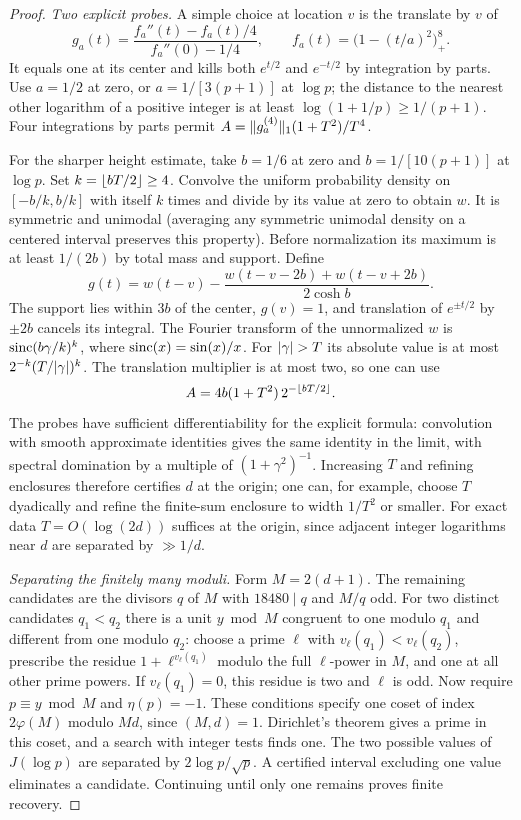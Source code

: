 \begin{proof}
\emph{Two explicit probes.} A simple choice at location $v$ is the translate by $v$ of
\[
 g_a(t)=\frac{f_a''(t)-f_a(t)/4}{f_a''(0)-1/4},\qquad f_a(t)=\bigl(1-(t/a)^2\bigr)_+^8 .
\]
It equals one at its center and kills both $e^{t/2}$ and $e^{-t/2}$ by integration by parts.
Use $a=1/2$ at zero, or $a=1/[3(p+1)]$ at $\log p$; the distance to the nearest other
logarithm of a positive integer is at least $\log(1+1/p)\ge1/(p+1)$. Four integrations by
parts permit $A=\lVert g_a^{(4)}\rVert_1(1+T^2)/T^4$.

For the sharper height estimate, take $b=1/6$ at zero and $b=1/[10(p+1)]$ at $\log p$. Set
$k=\lfloor bT/2\rfloor\ge4$. Convolve the uniform probability density on $[-b/k,b/k]$ with itself
$k$ times and divide by its value at zero to obtain $w$. It is symmetric and unimodal
(averaging any symmetric unimodal density on a centered interval preserves this property).
Before normalization its maximum is at least $1/(2b)$ by total mass and support. Define
\[
 g(t)=w(t-v)-\frac{w(t-v-2b)+w(t-v+2b)}{2\cosh b}.
\]
The support lies within $3b$ of the center, $g(v)=1$, and translation of $e^{\pm t/2}$ by
$\pm2b$ cancels its integral. The Fourier transform of the unnormalized $w$ is
$\operatorname{sinc}(b\gamma/k)^k$, where $\operatorname{sinc}(x)=\sin(x)/x$. For $\lvert\gamma\rvert>T$ its absolute
value is at most $2^{-k}(T/\lvert\gamma\rvert)^k$. The translation multiplier is at most two, so one
can use
\[
 A=4b(1+T^2)\,2^{-\lfloor bT/2\rfloor} .
\]
The probes have sufficient differentiability for the explicit formula: convolution with
smooth approximate identities gives the same identity in the limit, with spectral domination
by a multiple of $(1+\gamma^2)^{-1}$. Increasing $T$ and refining enclosures therefore
certifies $d$ at the origin; one can, for example, choose $T$ dyadically and refine the
finite-sum enclosure to width $1/T^2$ or smaller. For exact data $T=O(\log(2d))$ suffices at
the origin, since adjacent integer logarithms near $d$ are separated by $\gg1/d$.

\emph{Separating the finitely many moduli.} Form $M=2(d+1)$. The remaining candidates are
the divisors $q$ of $M$ with $18480\mid q$ and $M/q$ odd. For two distinct candidates
$q_1<q_2$ there is a unit $y\bmod M$ congruent to one modulo $q_1$ and different from one
modulo $q_2$: choose a prime $\ell$ with $v_\ell(q_1)<v_\ell(q_2)$, prescribe the residue
$1+\ell^{v_\ell(q_1)}$ modulo the full $\ell$-power in $M$, and one at all other prime
powers. If $v_\ell(q_1)=0$, this residue is two and $\ell$ is odd. Now require
$p\equiv y\bmod M$ and $\eta(p)=-1$. These conditions specify one coset of index
$2\varphi(M)$ modulo $Md$, since $(M,d)=1$. Dirichlet's theorem gives a prime in this
coset, and a search with integer tests finds one. The two possible values of $J(\log p)$
are separated by $2\log p/\sqrt p$. A certified interval excluding one value eliminates a
candidate. Continuing until only one remains proves finite recovery.


\end{proof}
